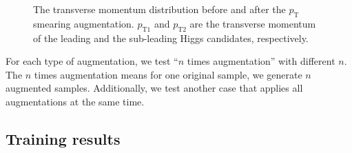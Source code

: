 \documentclass[12pt]{article}
\begin{document}
        \begin{figure}[htpb]
            \centering
            \caption{The transverse momentum distribution before and after the $p_{\text{T}}$ smearing augmentation. $p_{\text{T1}}$ and $p_{\text{T2}}$ are the transverse momentum of the leading and the sub-leading Higgs candidates, respectively.}
            \label{fig:pt_smearing_pt_distribution}
        \end{figure}

        For each type of augmentation, we test ``$n$ times augmentation'' with different $n$. The $n$ times augmentation means for one original sample, we generate $n$ augmented samples. Additionally, we test another case that applies all augmentations at the same time.
    \subsection{Training results}%
    \label{sub:training_results_physical_augmentation}
    
\end{document}
